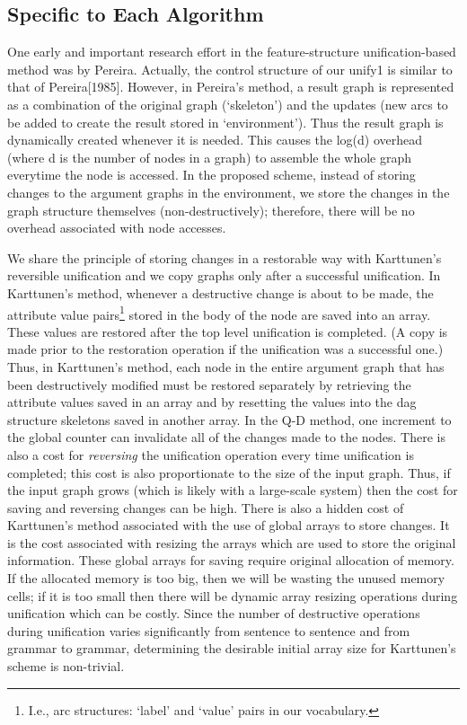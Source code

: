 \subsection{Specific to Each Algorithm}

 One early and important research effort in the feature-structure
unification-based method was by Pereira. Actually, the control
structure of our unify1 is similar to that of Pereira[1985].  However,
in Pereira's method, a result graph is represented as a combination of
the original graph (`skeleton') and the updates (new arcs to be added
to create the result stored in `environment'). Thus the result graph
is dynamically created whenever it is needed.  This causes the log(d)
overhead (where d is the number of nodes in a graph) to assemble the
whole graph everytime the node is accessed.  In the proposed scheme,
instead of storing changes to the argument graphs in the environment,
we store the changes in the graph structure themselves
(non-destructively); therefore, there will be no overhead associated
with node accesses.

We share the principle of storing changes in a restorable
way with Karttunen's reversible unification and we copy
graphs only after a successful unification.  In Karttunen's
method, whenever a destructive change is about to be made,
the attribute value pairs\footnote{I.e., arc structures:
`label' and `value' pairs in our vocabulary.} stored in the
body of the node are saved into an array.  These values are
restored after the top level unification is completed.  (A
copy is made prior to the restoration operation if the
unification was a successful one.) Thus, in Karttunen's
method, each node in the entire argument graph that has been
destructively modified must be restored separately by
retrieving the attribute values saved in an array and by
resetting the values into the dag structure skeletons saved
in another array. In the Q-D method, one increment to the
global counter can invalidate all of the changes made to the
nodes.  There is also a cost for {\it reversing} the
unification operation every time unification is completed;
this cost is also proportionate to the size of the input
graph. Thus, if the input graph grows (which is likely with
a large-scale system) then the cost for saving and reversing
changes can be high.  There is also a hidden cost of
Karttunen's method associated with the use of global arrays
to store changes. It is the cost associated with resizing
the arrays which are used to store the original information.
These global arrays for saving require original allocation
of memory. If the allocated memory is too big, then we will
be wasting the unused memory cells; if it is too small then
there will be dynamic array resizing operations during
unification which can be costly.  Since the number of
destructive operations during unification varies
significantly from sentence to sentence and from grammar to
grammar, determining the desirable initial array size for
Karttunen's scheme is non-trivial.

